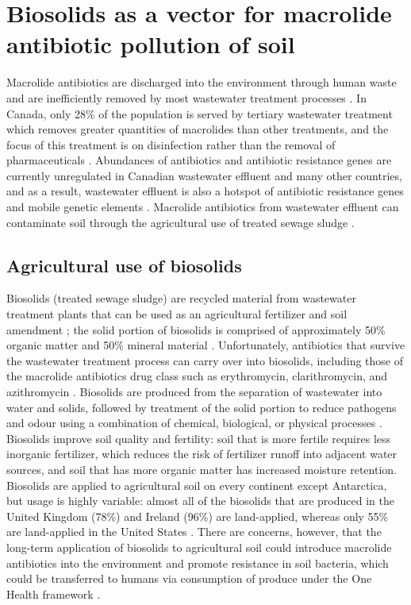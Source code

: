\section{Biosolids as a vector for macrolide antibiotic pollution of soil}

Macrolide antibiotics are discharged into the environment through human waste and are inefficiently removed by most wastewater treatment processes \parencite{LeMinh.2010, Luo.2014}.
In Canada, only 28\% of the population is served by tertiary wastewater treatment which removes greater quantities of macrolides than other treatments, and the focus of this treatment is on disinfection rather than the removal of pharmaceuticals \parencite{EnvironmentandClimateChangeCanada.2020, LeMinh.2010}.
Abundances of antibiotics and antibiotic resistance genes are currently unregulated in Canadian wastewater effluent and many other countries, and as a result, wastewater effluent is also a hotspot of antibiotic resistance genes and mobile genetic elements \parencite{Rizzo.2013, Che.2019}.
Macrolide antibiotics from wastewater effluent can contaminate soil through the agricultural use of treated sewage sludge \parencite{McClellan.2010, Sabourin.2012}.

\subsection{Agricultural use of biosolids}

Biosolids (treated sewage sludge) are recycled material from wastewater treatment plants that can be used as an agricultural fertilizer and soil amendment \parencite{Sharma.2017}; the solid portion of biosolids is comprised of approximately 50\% organic matter and 50\% mineral material \parencite{OntarioMinistryofAgricultureFoodandRuralAffairs.2010}.
Unfortunately, antibiotics that survive the wastewater treatment process can carry over into biosolids, including those of the macrolide antibiotics drug class such as erythromycin, clarithromycin, and azithromycin \parencite{McClellan.2010, Sabourin.2012, Chenxi.2008}.
Biosolids are produced from the separation of wastewater into water and solids, followed by treatment of the solid portion to reduce pathogens and odour using a combination of chemical, biological, or physical processes \parencite{LeMinh.2010}.
Biosolids improve soil quality and fertility:
soil that is more fertile requires less inorganic fertilizer, which reduces the risk of fertilizer runoff into adjacent water sources, and soil that has more organic matter has increased moisture retention.
Biosolids are applied to agricultural soil on every continent except Antarctica, but usage is highly variable:
almost all of the biosolids that are produced in the United Kingdom (78\%) and Ireland (96\%) are land-applied, whereas only 55\% are land-applied in the United States \parencite{Sharma.2017}.
There are concerns, however, that the long-term application of biosolids to agricultural soil could introduce macrolide antibiotics into the environment and promote resistance in soil bacteria, which could be transferred to humans via consumption of produce under the One Health framework \parencite{Lau.2020, Sabourin.2012}.

